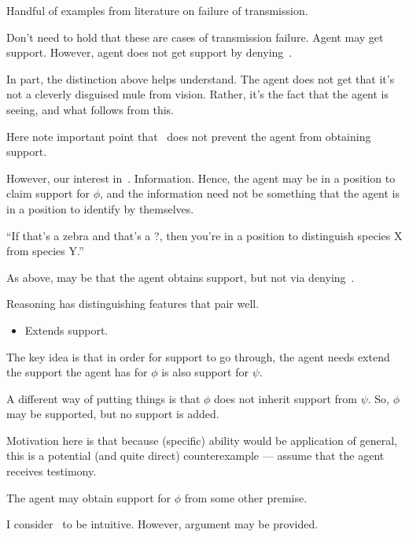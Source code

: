 \begin{note}
  Handful of examples from literature on failure of transmission.

  Don't need to hold that these are cases of transmission failure.
  Agent may get support.
  However, agent does not get support by denying~\nI{}.

  In part, the distinction above helps understand.
  The agent does not get that it's not a cleverly disguised mule from vision.
  Rather, it's the fact that the agent is seeing, and what follows from this.

  {
    \color{red}
    Here note important point that~\nI{} does not prevent the agent from obtaining support.
  }

  However, our interest in~\nI{}.
  Information.
  Hence, the agent may be in a position to claim support for \(\phi\), and the information need not be something that the agent is in a position to identify by themselves.

  ``If that's a zebra and that's a ?, then you're in a position to distinguish species X from species Y.''

  As above, may be that the agent obtains support, but not via denying~\nI{}.
\end{note}

\begin{note}
  Reasoning has distinguishing features that pair well.
  \begin{itemize}
  \item Extends support.
  \end{itemize}
\end{note}

\begin{note}
  The key idea is that in order for support to go through, the agent needs extend the support the agent has for \(\phi\) is also support for \(\psi\).

  {
    \color{red}
    A different way of putting things is that \(\phi\) does not inherit support from \(\psi\).
    So, \(\phi\) may be supported, but no support is added.
  }


  {
    \color{green}
    Motivation here is that because (specific) ability would be application of general, this is a potential (and quite direct) counterexample --- assume that the agent receives testimony.
  }


  {
    \color{red}
    The agent may obtain support for \(\phi\) from some other premise.
  }

  I consider~\nI{} to be intuitive.
  However, argument may be provided.
\end{note}

